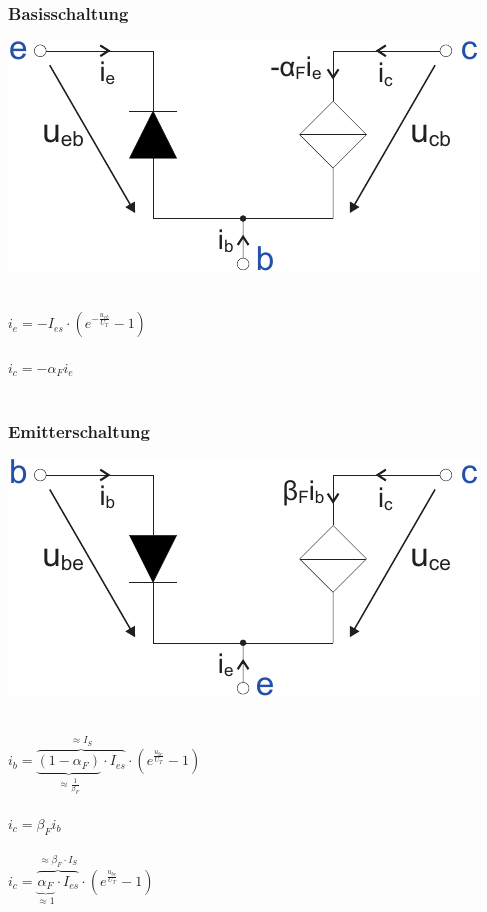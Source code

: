 \documentclass[a4paper,twocolumn,10pt]{article}
\begin{document}
\subsubsection*{Basisschaltung}
\begin{minipage}[b]{0.23\textwidth}
\includegraphics[width=\textwidth]{Grafiken/Basisschaltung_Vereinfachung}\\\\
\end{minipage}
\hfill
\begin{minipage}[b]{0.23\textwidth}
$i_e=-I_{es}\cdot (e^{-\frac{u_{eb}}{U_T}}-1)$\\\\
$i_c=-\alpha_Fi_e$\\\\
\end{minipage}

\subsubsection*{Emitterschaltung}
\begin{minipage}[b]{0.23\textwidth}
\includegraphics[width=\textwidth]{Grafiken/Emitterschaltung_Vereinfachung}\\\\
\end{minipage}
\hfill
\begin{minipage}[b]{0.23\textwidth}
$i_b=\overbrace{\underbrace{(1-\alpha_F)}_{\approx \frac{1}{\beta_F}}\cdot I_{es}}^{\approx I_S}\cdot (e^{\frac{u_{be}}{U_T}}-1)$\\\\
$i_c=\beta_Fi_b$\\\\
$i_c=\overbrace{\underbrace{\alpha_F}_{\approx 1}\cdot I_{es}}^{\approx \beta_F\cdot I_S}\cdot (e^{\frac{u_{be}}{U_T}}-1)$\\
\end{minipage}
\end{document}
